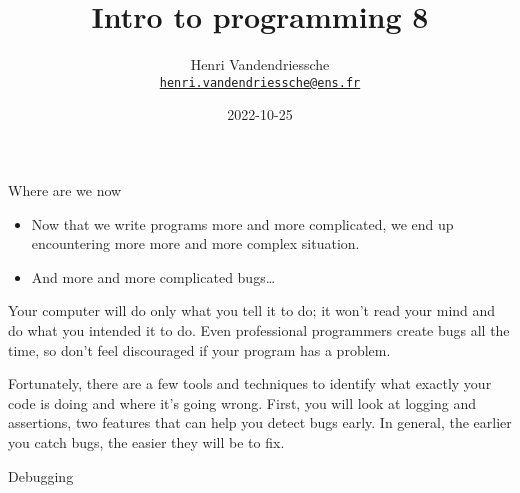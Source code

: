 \documentclass[
  8pt,
  ignorenonframetext,
]{beamer}
\title{Intro to programming 8}
\author{Henri Vandendriessche\\
\href{mailto:henri.vandendriessche@ens.fr}{\nolinkurl{henri.vandendriessche@ens.fr}}}
\date{2022-10-25}
\begin{document}
\frame{\titlepage}

\begin{frame}{Where are we now}
\protect\hypertarget{where-are-we-now}{}
\begin{itemize}
\item
  Now that we write programs more and more complicated, we end up
  encountering more more and more complex situation.
\item
  And more and more complicated bugs\ldots{}
\end{itemize}

Your computer will do only what you tell it to do; it won't read your
mind and do what you intended it to do. Even professional programmers
create bugs all the time, so don't feel discouraged if your program has
a problem.

Fortunately, there are a few tools and techniques to identify what
exactly your code is doing and where it's going wrong. First, you will
look at logging and assertions, two features that can help you detect
bugs early. In general, the earlier you catch bugs, the easier they will
be to fix.
\end{frame}

\begin{frame}{Debugging}
\protect\hypertarget{debugging}{}
\end{frame}
\end{document}
